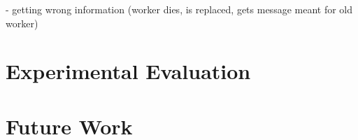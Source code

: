 \documentclass[enabledeprecatedfontcommands,12pt,a4paper,twoside]{scrartcl}
\numberwithin{equation}{section}
\begin{document}
	- getting wrong information (worker dies, is replaced, gets message meant for old worker)



\section{Experimental Evaluation}

\section{Future Work}


\clearpage




\end{document}

